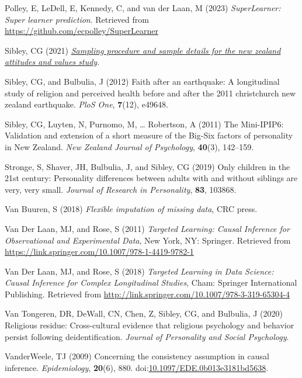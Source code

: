 \documentclass[
  singlecolumn]{article}
\newlength{\cslhangindent}
\newenvironment{CSLReferences}[2] %
 {\begin{list}{}{%
  \setlength{\itemindent}{0pt}
  \setlength{\leftmargin}{0pt}
  \setlength{\parsep}{0pt}
  \ifodd #1
   \setlength{\leftmargin}{\cslhangindent}
   \setlength{\itemindent}{-1\cslhangindent}
  \fi
  \setlength{\itemsep}{#2\baselineskip}}}
 {\end{list}}
\begin{document}
\begin{CSLReferences}{1}{0}
Polley, E, LeDell, E, Kennedy, C, and van der Laan, M (2023)
\emph{SuperLearner: Super learner prediction}. Retrieved from
\url{https://github.com/ecpolley/SuperLearner}

Sibley, CG (2021)
\emph{\href{https://doi.org/10.31234/osf.io/wgqvy}{Sampling procedure
and sample details for the new zealand attitudes and values study}}.

Sibley, CG, and Bulbulia, J (2012) Faith after an earthquake: A
longitudinal study of religion and perceived health before and after the
2011 christchurch new zealand earthquake. \emph{PloS One},
\textbf{7}(12), e49648.

Sibley, CG, Luyten, N, Purnomo, M, \ldots{} Robertson, A (2011) The
Mini-IPIP6: Validation and extension of a short measure of the Big-Six
factors of personality in New Zealand. \emph{New Zealand Journal of
Psychology}, \textbf{40}(3), 142--159.

Stronge, S, Shaver, JH, Bulbulia, J, and Sibley, CG (2019) Only children
in the 21st century: Personality differences between adults with and
without siblings are very, very small. \emph{Journal of Research in
Personality}, \textbf{83}, 103868.

Van Buuren, S (2018) \emph{Flexible imputation of missing data}, CRC
press.

Van Der Laan, MJ, and Rose, S (2011) \emph{Targeted Learning: Causal
Inference for Observational and Experimental Data}, New York, NY:
Springer. Retrieved from
\url{https://link.springer.com/10.1007/978-1-4419-9782-1}

Van Der Laan, MJ, and Rose, S (2018) \emph{Targeted Learning in Data
Science: Causal Inference for Complex Longitudinal Studies}, Cham:
Springer International Publishing. Retrieved from
\url{http://link.springer.com/10.1007/978-3-319-65304-4}

Van Tongeren, DR, DeWall, CN, Chen, Z, Sibley, CG, and Bulbulia, J
(2020) Religious residue: Cross-cultural evidence that religious
psychology and behavior persist following deidentification.
\emph{Journal of Personality and Social Psychology}.

VanderWeele, TJ (2009) Concerning the consistency assumption in causal
inference. \emph{Epidemiology}, \textbf{20}(6), 880.
doi:\href{https://doi.org/10.1097/EDE.0b013e3181bd5638}{10.1097/EDE.0b013e3181bd5638}.


\end{CSLReferences}
\end{document}
